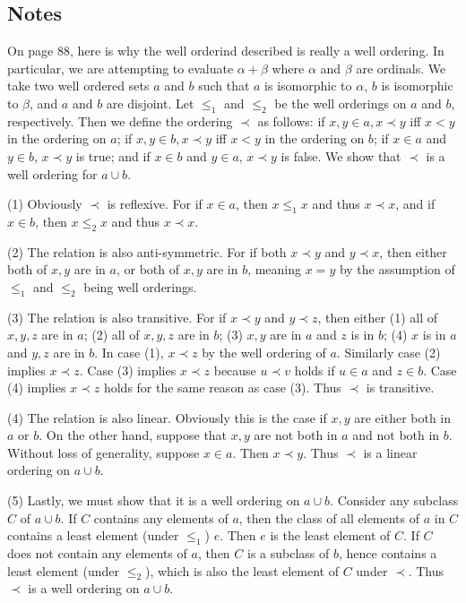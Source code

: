 \documentclass{article}
\theoremstyle{definition}
\begin{document}
\subsection*{Notes}
On page 88, here is why the well orderind described is really a well ordering. In particular, we are attempting to evaluate $\alpha+\beta$ where $\alpha$ 
and $\beta$ are ordinals. We take two well ordered sets $a$ and $b$ such that $a$ is isomorphic to $\alpha$, $b$ is isomorphic to $\beta$, and 
$a$ and $b$ are disjoint. Let $\le_1$ and $\le_2$ be the well orderings on $a$ and $b$, respectively. Then we define the ordering $\prec$ as follows: 
if $x,y\in a,x\prec y$ iff $x<y$ in the ordering on $a$; if $x,y\in b,x\prec y$ iff $x<y$ in the ordering on $b$; if $x\in a$ and $y\in b$, $x\prec y$ is true; and 
if $x\in b$ and $y\in a$, $x\prec y$ is false. We show that $\prec$ is a well ordering for $a\cup b$. 

(1) Obviously $\prec$ is reflexive. For if 
$x\in a$, then $x\le_1 x$ and thus $x\prec x$, and if $x\in b$, then $x\le_2 x$ and thus $x\prec x$. 

(2) The relation is also anti-symmetric. For if 
both $x\prec y$ and $y\prec x$, then either both of $x,y$ are in $a$, or both of $x,y$ are in $b$, meaning $x=y$ by the assumption of $\le_1$ and $\le_2$ being 
well orderings. 

(3) The relation is also transitive. For if $x\prec y$ and $y\prec z$, then either (1) all of $x,y,z$ are in $a$; (2) all of $x,y,z$ are in $b$; 
(3) $x,y$ are in $a$ and $z$ is in $b$; (4) $x$ is in $a$ and $y,z$ are in $b$. In case (1), $x\prec z$ by the well ordering of $a$. Similarly 
case (2) implies $x\prec z$. Case (3) implies $x\prec z$ because $u\prec v$ holds if $u\in a$ and $z\in b$. Case (4) implies $x\prec z$ holds for the 
same reason as case (3). Thus $\prec$ is transitive. 

(4) The relation is also linear. Obviously this is the case if $x,y$ are either both in $a$ or $b$. On the other 
hand, suppose that $x,y$ are not both in $a$ and not both in $b$. Without loss of generality, suppose $x\in a$. Then $x\prec y$. Thus $\prec$ is a linear 
ordering on $a\cup b$. 

(5) Lastly, we must show that it is a well ordering on $a\cup b$. Consider any subclass $C$ of $a\cup b$. If $C$ contains any elements of 
$a$, then the class of all elements of $a$ in $C$ contains a least element (under $\le_1$) $e$. Then $e$ is the least element of $C$. If $C$ does not contain 
any elements of $a$, then $C$ is a subclass of $b$, hence contains a least element (under $\le_2$), which is also the least element of $C$ under $\prec$. Thus 
$\prec$ is a well ordering on $a\cup b$. 
\end{document}
